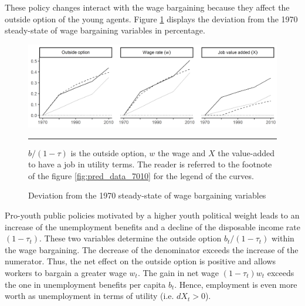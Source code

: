 
These policy changes interact with the wage bargaining because they affect the outside option of the young agents. Figure \ref{fig:dev_bargain_7010} displays the deviation from the 1970 steady-state of wage bargaining variables in percentage.
\begin{figure}[tb]
	\centering
	\includegraphics[width=1\linewidth]{../result/deviation/dev_bargain7010.png}
	\caption{Deviation from the 1970 steady-state of wage bargaining variables}
	\label{fig:dev_bargain_7010}
	\vspace{.5ex}
	\hrule
	\vspace{-4ex}
	\justify\singlespacing\footnotesize $b/(1-\tau)$ is the outside option, $w$ the wage and $X$ the value-added to have a job in utility terms. The reader is referred to the footnote of the figure \ref{fig:pred_data_7010} for the legend of the curves.
\end{figure}
Pro-youth public policies motivated by a higher youth political weight leads to an increase of the unemployment benefits and a decline of the disposable income rate $(1-\tau_t)$. These two variables determine the outside option $b_t/(1-\tau_t)$ within the wage bargaining. The decrease of the denominator exceeds the increase of the numerator. Thus, the net effect on the outside option is positive and allows workers to bargain a greater wage $w_t$. The gain in net wage $(1-\tau_t)w_t$ exceeds the one in unemployment benefits per capita $b_t$. Hence, employment is even more worth as unemployment in terms of utility (i.e. $dX_t > 0$).

